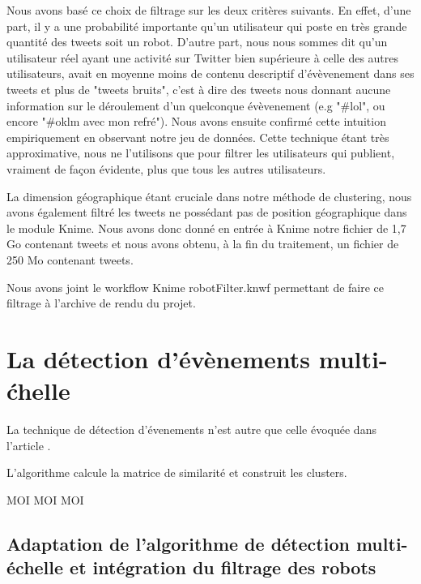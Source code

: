 \documentclass[12pt]{article}
\begin{document}
Nous avons bas\'e ce choix de filtrage sur les deux crit\`eres suivants. En effet, d'une part, il y a une probabilit\'e importante qu'un utilisateur qui poste en tr\`es grande quantit\'e des tweets soit un robot. D'autre part, nous nous sommes dit qu'un utilisateur r\'eel ayant une activit\'e sur Twitter bien sup\'erieure \`{a} celle des autres utilisateurs, avait en moyenne moins de contenu descriptif d'\'ev\`evenement dans ses tweets et plus de "tweets bruits", c'est \`{a} dire des tweets nous donnant aucune information sur le d\'eroulement d'un quelconque \'ev\`evenement (e.g "\#lol", ou encore "\#oklm avec mon refr\'e"). Nous avons ensuite confirm\'e cette intuition empiriquement en observant notre jeu de donn\'ees. 
\newline
Cette technique \'etant tr\`es approximative, nous ne l'utilisons que pour filtrer les utilisateurs qui publient, vraiment de fa\c{c}on \'evidente, plus que tous les autres utilisateurs.

La dimension g\'eographique \'etant cruciale dans notre m\'ethode de clustering, nous avons \'egalement filtr\'e les tweets ne poss\'edant pas de position g\'eographique dans le module Knime. Nous avons donc donn\'e en entr\'ee \`{a} Knime notre fichier de 1,7 Go contenant  tweets et nous avons obtenu, \`{a} la fin du traitement, un fichier de 250 Mo contenant  tweets. 

Nous avons joint le workflow Knime robotFilter.knwf permettant de faire ce filtrage \`a l'archive de rendu du projet.

\vfill
\newpage

\section{La d\'etection d'\'ev\`enements multi-\'chelle}
\label{sec:multiscale}

La technique de d\'etection d'\'evenements n'est autre que celle \'evoqu\'ee dans l'article \cite{Multievents}.

L'algorithme calcule la matrice de similarit\'e et construit les clusters.

MOI
\newline 
MOI 
\newline
MOI

\subsection{Adaptation de l'algorithme de d\'etection multi-\'echelle et int\'egration du filtrage des robots}
\end{document}

